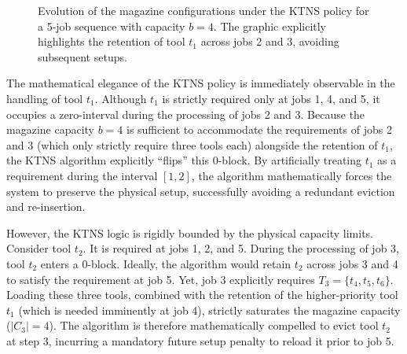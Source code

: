 \documentclass[11pt, a4paper]{book}
\begin{document}
\begin{figure}[H]
		\caption{Evolution of the magazine configurations under the KTNS policy for a 5-job sequence with capacity $b=4$. The graphic explicitly highlights the retention of tool $t_1$ across jobs 2 and 3, avoiding subsequent setups.}
		\label{fig:ktns_evolution}
	\end{figure}
	
	The mathematical elegance of the KTNS policy is immediately observable in the handling of tool $t_1$. Although $t_1$ is strictly required only at jobs 1, 4, and 5, it occupies a zero-interval during the processing of jobs 2 and 3. Because the magazine capacity $b=4$ is sufficient to accommodate the requirements of jobs 2 and 3 (which only strictly require three tools each) alongside the retention of $t_1$, the KTNS algorithm explicitly ``flips'' this 0-block. By artificially treating $t_1$ as a requirement during the interval $[1, 2]$, the algorithm mathematically forces the system to preserve the physical setup, successfully avoiding a redundant eviction and re-insertion.
	
	However, the KTNS logic is rigidly bounded by the physical capacity limits. Consider tool $t_2$. It is required at jobs 1, 2, and 5. During the processing of job 3, tool $t_2$ enters a 0-block. Ideally, the algorithm would retain $t_2$ across jobs 3 and 4 to satisfy the requirement at job 5. Yet, job 3 explicitly requires $T_3 = \{t_4, t_5, t_6\}$. Loading these three tools, combined with the retention of the higher-priority tool $t_1$ (which is needed imminently at job 4), strictly saturates the magazine capacity ($|C_3| = 4$). The algorithm is therefore mathematically compelled to evict tool $t_2$ at step 3, incurring a mandatory future setup penalty to reload it prior to job 5. 
	
\end{document}
